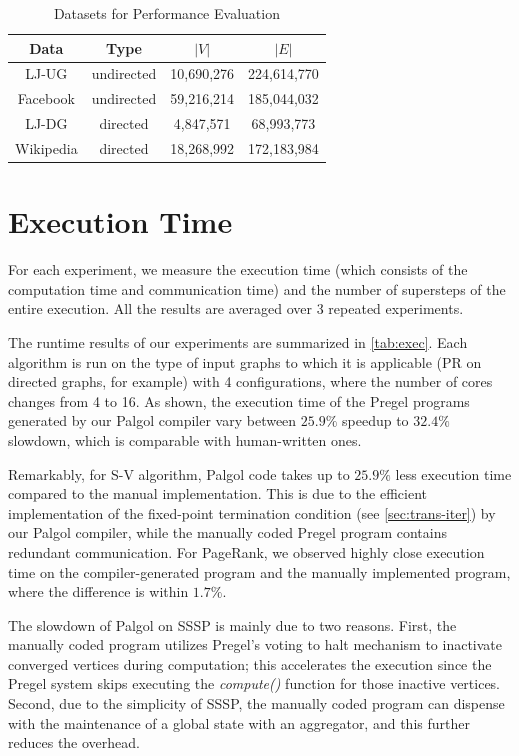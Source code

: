 \documentclass{sokendai_thesis} %
\begin{document}
\begin{table}[t]
 \centering
 \caption{Datasets for Performance Evaluation}
 \label{tab:datasets}
 \begin{tabular}{|c|c|c|c|}
  \hline
  Data & Type & $|V|$ & $|E|$ \\
  \hline\hline
  LJ-UG & undirected & 10,690,276 & 224,614,770 \\
  \hline
  Facebook & undirected & 59,216,214 & 185,044,032 \\
  \hline
  LJ-DG & directed & 4,847,571 & 68,993,773 \\
  \hline
  Wikipedia & directed & 18,268,992 & 172,183,984 \\
  \hline
 \end{tabular}
\vspace{-2ex}\end{table}

\section{Execution Time}

For each experiment, we measure the execution time (which consists of the computation time and communication time) and the number of supersteps of the entire execution.
All the results are averaged over 3 repeated experiments.

The runtime results of our experiments are summarized in \autoref{tab:exec}.
Each algorithm is run on the type of input graphs to which it is applicable (PR on directed graphs, for example) with 4 configurations, where the number of cores changes from 4 to 16.
As shown, the execution time of the Pregel programs generated by our Palgol compiler vary between $25.9\%$ speedup to $32.4\%$ slowdown, which is comparable with human-written ones.

Remarkably, for S-V algorithm, Palgol code takes up to $25.9\%$ less execution time compared to the manual implementation.
This is due to the efficient implementation of the fixed-point termination condition (see \autoref{sec:trans-iter}) by our Palgol compiler, while the manually coded Pregel program contains redundant communication.
For PageRank, we observed highly close execution time on the compiler-generated program and the manually implemented program, where the difference is within $1.7\%$.

The slowdown of Palgol on SSSP is mainly due to two reasons.
First, the manually coded program utilizes Pregel's voting to halt mechanism to inactivate converged vertices during computation;  this accelerates the execution since the Pregel system skips executing the \emph{compute()} function for those inactive vertices.
Second, due to the simplicity of SSSP, the manually coded program can dispense with the maintenance of a global state with an aggregator, and this further reduces the overhead.
\end{document}
